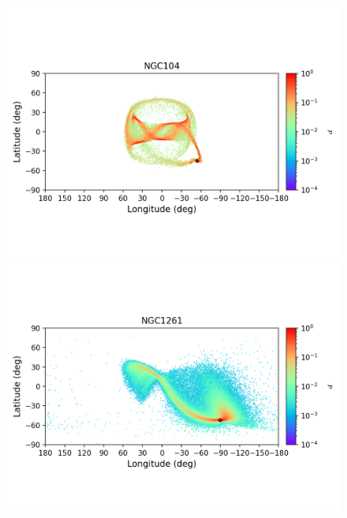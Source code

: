         \begin{figure}
            \begin{center}
                \includegraphics[clip=true, trim = 0mm 20mm 0mm 10mm, width=1\columnwidth]{images/error_plots_NGC104.png}
                \includegraphics[clip=true, trim = 0mm 20mm 0mm 10mm, width=1\columnwidth]{images/error_plots_NGC1261.png}
                

\end{center}
\end{figure}
